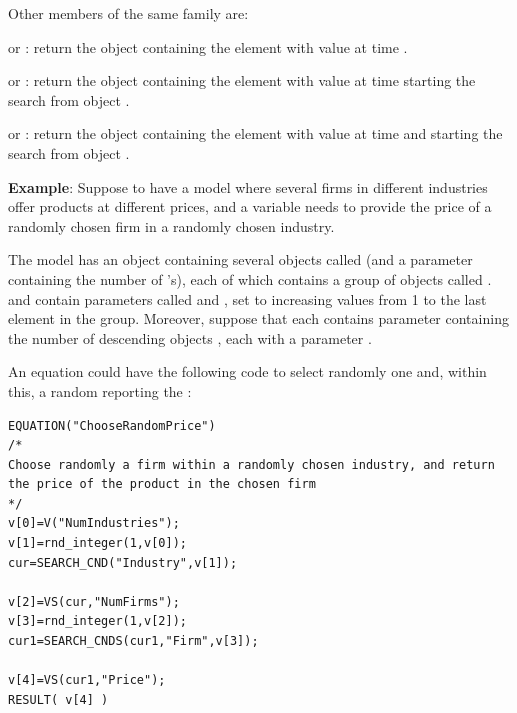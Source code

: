 \documentclass [11pt,a4paper] {book}
\begin{document}
Other members of the same family are:
\begin{list}{-}{\itemsep -0.2cm}
\item {} or : return the object containing the element  with value  at time . 

\item {} or : return the object containing the element  with value  at time  starting the search from object . 

\item {} or : return the object containing the element  with value  at time  and starting the search from object . 

\end{list}

\textbf{Example}: Suppose to have a model where several firms in different industries
offer products at different prices, and a variable needs to provide the price of a randomly chosen firm in a randomly chosen industry.

The model has an object  containing several objects called 
(and a parameter  containing the number of 's), each of
which contains a group of objects called .  and 
contain parameters called  and , set to increasing values
from 1 to the last element in the group. Moreover, suppose that each 
contains parameter  containing the number of descending objects ,
each with a parameter .

An equation could have the following code to select randomly one  and,
within this, a random  reporting the :

 \small
\begin{verbatim}
EQUATION("ChooseRandomPrice")
/*
Choose randomly a firm within a randomly chosen industry, and return
the price of the product in the chosen firm
*/
v[0]=V("NumIndustries");
v[1]=rnd_integer(1,v[0]);
cur=SEARCH_CND("Industry",v[1]);

v[2]=VS(cur,"NumFirms");
v[3]=rnd_integer(1,v[2]);
cur1=SEARCH_CNDS(cur1,"Firm",v[3]);

v[4]=VS(cur1,"Price");
RESULT( v[4] )
\end{verbatim}
\normalsize
\end{document}
